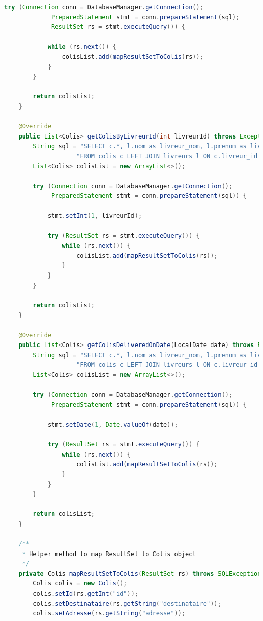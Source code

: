 \documentclass{rapportENSIAS}
\begin{document}
\begin{lstlisting}[language=Java, caption=Impl\'{e}mentation ColisDAOImpl compl\`{e}te]
        try (Connection conn = DatabaseManager.getConnection();
             PreparedStatement stmt = conn.prepareStatement(sql);
             ResultSet rs = stmt.executeQuery()) {
            
            while (rs.next()) {
                colisList.add(mapResultSetToColis(rs));
            }
        }
        
        return colisList;
    }
    
    @Override
    public List<Colis> getColisByLivreurId(int livreurId) throws Exception {
        String sql = "SELECT c.*, l.nom as livreur_nom, l.prenom as livreur_prenom, l.telephone as livreur_telephone " +
                    "FROM colis c LEFT JOIN livreurs l ON c.livreur_id = l.id WHERE c.livreur_id = ? ORDER BY c.dateEnvoi DESC";
        List<Colis> colisList = new ArrayList<>();
        
        try (Connection conn = DatabaseManager.getConnection();
             PreparedStatement stmt = conn.prepareStatement(sql)) {
            
            stmt.setInt(1, livreurId);
            
            try (ResultSet rs = stmt.executeQuery()) {
                while (rs.next()) {
                    colisList.add(mapResultSetToColis(rs));
                }
            }
        }
        
        return colisList;
    }
    
    @Override
    public List<Colis> getColisDeliveredOnDate(LocalDate date) throws Exception {
        String sql = "SELECT c.*, l.nom as livreur_nom, l.prenom as livreur_prenom, l.telephone as livreur_telephone " +
                    "FROM colis c LEFT JOIN livreurs l ON c.livreur_id = l.id WHERE c.dateLivraison = ? ORDER BY c.id";
        List<Colis> colisList = new ArrayList<>();
        
        try (Connection conn = DatabaseManager.getConnection();
             PreparedStatement stmt = conn.prepareStatement(sql)) {
            
            stmt.setDate(1, Date.valueOf(date));
            
            try (ResultSet rs = stmt.executeQuery()) {
                while (rs.next()) {
                    colisList.add(mapResultSetToColis(rs));
                }
            }
        }
        
        return colisList;
    }
    
    /**
     * Helper method to map ResultSet to Colis object
     */
    private Colis mapResultSetToColis(ResultSet rs) throws SQLException {
        Colis colis = new Colis();
        colis.setId(rs.getInt("id"));
        colis.setDestinataire(rs.getString("destinataire"));
        colis.setAdresse(rs.getString("adresse"));
        

\end{lstlisting}
\end{document}
